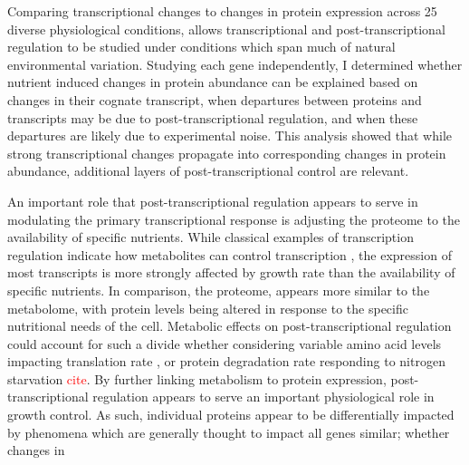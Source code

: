 Comparing transcriptional changes to changes in protein expression across 25 diverse physiological conditions, allows transcriptional and post-transcriptional regulation to be studied under conditions which span much of natural environmental variation.  Studying each gene independently, I determined whether nutrient induced changes in protein abundance can be explained based on changes in their cognate transcript, when departures between proteins and transcripts may be due to post-transcriptional regulation, and when these departures are likely due to experimental noise. This analysis showed that while strong transcriptional changes propagate into corresponding changes in protein abundance, additional layers of post-transcriptional control are relevant.

An important role that post-transcriptional regulation appears to serve in modulating the primary transcriptional response is adjusting the proteome to the availability of specific nutrients. While classical examples of transcription regulation indicate how metabolites can control transcription \cite{Jacob:1961du, Jones:1982dn}, the expression of most transcripts is more strongly affected by growth rate than the availability of specific nutrients.  In comparison, the proteome, appears more similar to the metabolome, with protein levels being altered in response to the specific nutritional needs of the cell. Metabolic effects on post-transcriptional regulation could account for such a divide whether considering variable amino acid levels impacting translation rate \cite{Klumpp:2009ic}, or protein degradation rate responding to nitrogen starvation \textcolor{red}{cite}. By further linking metabolism to protein expression, post-transcriptional regulation appears to serve an important physiological role in growth control. As such, individual proteins appear to be differentially impacted by phenomena which are generally thought to impact all genes similar; whether changes in  


